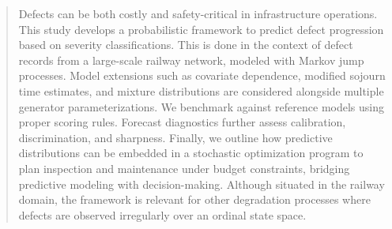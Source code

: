 
\begin{abstract}
Defects can be both costly and safety-critical in infrastructure operations. 
This study develops a probabilistic framework to predict defect progression based on severity classifications.
This is done in the context of defect records from a large-scale railway network, modeled with Markov jump processes.
Model extensions such as covariate dependence, modified sojourn time estimates, and mixture distributions are considered alongside multiple generator parameterizations.
We benchmark against reference models using proper scoring rules. Forecast diagnostics further assess calibration, discrimination, and sharpness. 
Finally, we outline how predictive distributions can be embedded in a stochastic optimization program to plan inspection and maintenance under budget constraints, bridging predictive modeling with decision-making.
Although situated in the railway domain, the framework is relevant for other degradation processes where defects are observed irregularly over an ordinal state space.
\end{abstract}